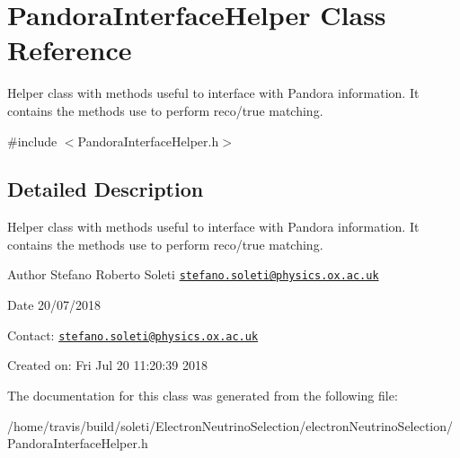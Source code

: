 \hypertarget{classPandoraInterfaceHelper}{\section{Pandora\-Interface\-Helper Class Reference}
\label{classPandoraInterfaceHelper}
}


Helper class with methods useful to interface with Pandora information. It contains the methods use to perform reco/true matching.  




{\ttfamily \#include $<$Pandora\-Interface\-Helper.\-h$>$}



\subsection{Detailed Description}
Helper class with methods useful to interface with Pandora information. It contains the methods use to perform reco/true matching. 

\begin{DoxyAuthor}{Author}
Stefano Roberto Soleti \href{mailto:stefano.soleti@physics.ox.ac.uk}{\tt stefano.\-soleti@physics.\-ox.\-ac.\-uk}
\end{DoxyAuthor}
\begin{DoxyDate}{Date}
20/07/2018
\end{DoxyDate}
Contact\-: \href{mailto:stefano.soleti@physics.ox.ac.uk}{\tt stefano.\-soleti@physics.\-ox.\-ac.\-uk}

Created on\-: Fri Jul 20 11\-:20\-:39 2018 

The documentation for this class was generated from the following file\-:\begin{DoxyCompactItemize}
\item 
/home/travis/build/soleti/\-Electron\-Neutrino\-Selection/electron\-Neutrino\-Selection/Pandora\-Interface\-Helper.\-h\end{DoxyCompactItemize}
